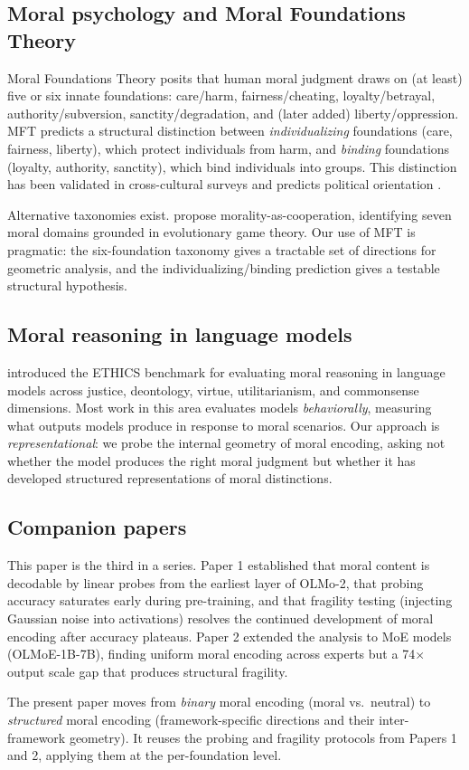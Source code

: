 \subsection{Moral psychology and Moral Foundations Theory}\label{moral-psychology-and-moral-foundations-theory}

Moral Foundations Theory \citep[MFT;][]{haidt2012righteous,
graham2013mft} posits that human moral judgment draws on (at least)
five or six innate foundations: care/harm, fairness/cheating,
loyalty/betrayal, authority/subversion, sanctity/degradation, and
(later added) liberty/oppression. MFT predicts a structural
distinction between \emph{individualizing} foundations (care, fairness,
liberty), which protect individuals from harm, and \emph{binding}
foundations (loyalty, authority, sanctity), which bind individuals
into groups. This distinction has been validated in cross-cultural
surveys and predicts political orientation
\citep{graham2013mft}.

Alternative taxonomies exist. \citet{curry2019cooperation} propose
morality-as-cooperation, identifying seven moral domains grounded
in evolutionary game theory. Our use of MFT is pragmatic: the
six-foundation taxonomy gives a tractable set of directions for
geometric analysis, and the individualizing/binding prediction
gives a testable structural hypothesis.

\subsection{Moral reasoning in language models}\label{moral-reasoning-in-language-models}

\citet{hendrycks2021ethics} introduced the ETHICS benchmark for
evaluating moral reasoning in language models across justice,
deontology, virtue, utilitarianism, and commonsense dimensions.
Most work in this area evaluates models \emph{behaviorally},
measuring what outputs models produce in response to moral
scenarios. Our approach is \emph{representational}: we probe the
internal geometry of moral encoding, asking not whether the model
produces the right moral judgment but whether it has developed
structured representations of moral distinctions.

\subsection{Companion papers}\label{companion-papers}

This paper is the third in a series. Paper 1
\citep{reblitzrichardson2026fragility} established that moral
content is decodable by linear probes from the earliest layer
of OLMo-2, that probing accuracy saturates early during
pre-training, and that fragility testing (injecting Gaussian
noise into activations) resolves the continued development of
moral encoding after accuracy plateaus. Paper 2
\citep{reblitzrichardson2026dilution} extended the analysis to
MoE models (OLMoE-1B-7B), finding uniform moral encoding across
experts but a 74\(\times\) output scale gap that produces structural
fragility.

The present paper moves from \emph{binary} moral encoding (moral
vs.~neutral) to \emph{structured} moral encoding (framework-specific
directions and their inter-framework geometry). It reuses the
probing and fragility protocols from Papers 1 and 2, applying
them at the per-foundation level.
